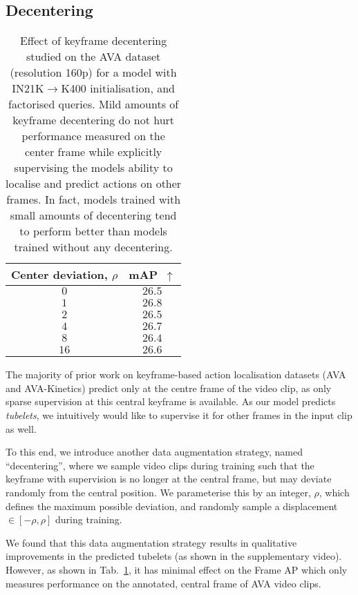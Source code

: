 \documentclass[10pt,twocolumn,letterpaper]{article}
\begin{document}
\subsection{Decentering}
\label{sec:keyframe_decentering}
\begin{table}[t]
\centering
\caption{Effect of keyframe decentering studied on the AVA dataset (resolution 160p) for a model with IN21K$\to$K400 initialisation, and factorised queries.
Mild amounts of keyframe decentering do not hurt performance measured on the center frame while explicitly supervising the models ability to localise and predict actions on other frames.
In fact, models trained with small amounts of decentering tend to perform better than models trained without any decentering.
}
\begin{tabular}{cc}
\toprule
Center deviation, $\rho$ & mAP~$\uparrow$ \\  \midrule
$0$         &  $26.5$  \\
$1$      &  $26.8$  \\
$2$      &  $26.5$  \\
$4$      &  $26.7$  \\
$8$      &  $26.4$  \\
$16$     &  $26.6$  \\
\bottomrule
\end{tabular}
\label{tab:ablation_decentering}
\end{table}
 
The majority of prior work on keyframe-based action localisation datasets (\eg AVA and AVA-Kinetics) predict only at the centre frame of the video clip, as only sparse supervision at this central keyframe is available.
As our model predicts \textit{tubelets}, we intuitively would like to supervise it for other frames in the input clip as well.

To this end, we introduce another data augmentation strategy, named ``decentering'', where we sample video clips during training such that the keyframe with supervision is no longer at the central frame, but may deviate randomly from the central position.
We parameterise this by an integer, $\rho$, which defines the maximum possible deviation, and randomly sample a displacement $\in [-\rho, \rho]$ during training.

We found that this data augmentation strategy results in qualitative improvements in the predicted tubelets (as shown in the supplementary video).
However, as shown in Tab.~\ref{tab:ablation_decentering}, it has minimal effect on the Frame AP which only measures performance on the annotated, central frame of AVA video clips.
\end{document}
